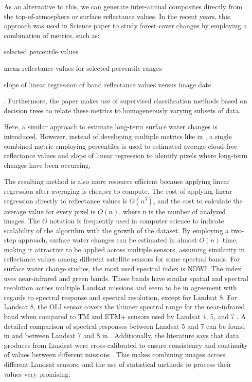 As an alternative to this, we can generate inter-annual composites directly from the top-of-atmosphere or surface reflectance values. In the recent years, this approach was used in Science paper \citep{Hansen2013} to study forest cover changes by employing a combination of metrics, such as: 
\begin{enumerate*}[label=(\emph{\alph*})]
	\item selected percentile values
	\item mean reflectance values for selected percentile ranges
	\item slope of linear regression of band reflectance values versus image date
\end{enumerate*}. Furthermore, the paper makes use of supervised classification methods based on decision trees to relate these metrics to homogeneously varying subsets of data.

Here, a similar approach to estimate long-term surface water changes is introduced. However, instead of developing multiple metrics like in \citep{Hansen2013}, a single combined metric employing percentiles is used to estimated average cloud-free reflectance values and slope of linear regression to identify pixels where long-term changes have been occurring. 

The resulting method is also more resource efficient because applying linear regression after averaging is cheaper to compute. The cost of applying linear regression directly to reflectance values is $O(n^3)$, and the cost to calculate the average value for every pixel is $O(n)$, where n is the number of analyzed images. The $O$ notation is frequently used in computer science to indicate scalability of the algorithm with the growth of the dataset. By employing a two-step approach, surface water changes can be estimated in almost $O(n)$ time, making it attractive to be applied across multiple sensors, assuming similarity in reflectance values among different satellite sensors for some spectral bands. For surface water change studies, the most used spectral index is NDWI. The index uses near-infrared and green bands. These bands have similar spatial and spectral resolution across multiple Landsat missions and seem to be in agreement with regards to spectral response and spectral resolution, except for Landsat 8. For Landsat 8, the OLI sensor covers the thinner spectral range for the near-infrared band when compared to TM and ETM+ sensors used by Landsat 4, 5, and 7 \citep{roy2016characterization, angal2014cross}. A detailed comparison of spectral responses between Landsat 5 and 7 can be found in \citep{teillet2001radiometric} and between Landsat 7 and 8 in \citep{flood2014continuity}. Additionally, the literature says that data produces from Landsat were cross-calibrated to ensure consistency and continuity of values between different missions \citep{mishra2014radiometric}. This makes combining images across different Landsat sensors, and the use of statistical methods to process their values very promising.

